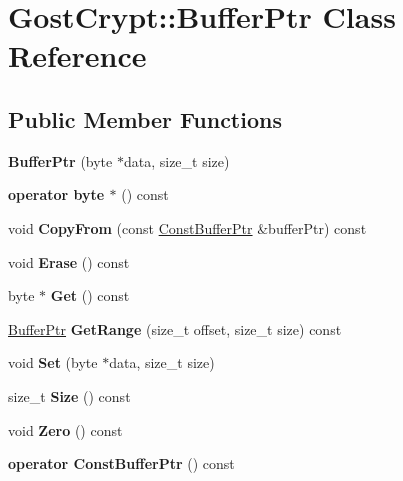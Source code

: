 \hypertarget{class_gost_crypt_1_1_buffer_ptr}{}\section{Gost\+Crypt\+:\+:Buffer\+Ptr Class Reference}
\label{class_gost_crypt_1_1_buffer_ptr}
\subsection*{Public Member Functions}
\begin{DoxyCompactItemize}
\item 
\mbox{\label{class_gost_crypt_1_1_buffer_ptr_aa4653bc7df919366a06b0e43c0cdd0f9}} 
{\bfseries Buffer\+Ptr} (byte $\ast$data, size\+\_\+t size)
\item 
\mbox{\label{class_gost_crypt_1_1_buffer_ptr_a1221ad784491b818cbdadbb60ae0c93a}} 
{\bfseries operator byte $\ast$} () const
\item 
\mbox{\label{class_gost_crypt_1_1_buffer_ptr_a6865e71f09b7a6bc81d5a61e227dc88e}} 
void {\bfseries Copy\+From} (const \hyperlink{class_gost_crypt_1_1_const_buffer_ptr}{Const\+Buffer\+Ptr} \&buffer\+Ptr) const
\item 
\mbox{\label{class_gost_crypt_1_1_buffer_ptr_a4c48cd5f9936d08c81d522cb057ba11c}} 
void {\bfseries Erase} () const
\item 
\mbox{\label{class_gost_crypt_1_1_buffer_ptr_a92c82dbba7c59d2564582a3918caacd5}} 
byte $\ast$ {\bfseries Get} () const
\item 
\mbox{\label{class_gost_crypt_1_1_buffer_ptr_a1ab1cb3943deba427d94c24a39d56786}} 
\hyperlink{class_gost_crypt_1_1_buffer_ptr}{Buffer\+Ptr} {\bfseries Get\+Range} (size\+\_\+t offset, size\+\_\+t size) const
\item 
\mbox{\label{class_gost_crypt_1_1_buffer_ptr_ae8963263d39a48506f88043f168c18c5}} 
void {\bfseries Set} (byte $\ast$data, size\+\_\+t size)
\item 
\mbox{\label{class_gost_crypt_1_1_buffer_ptr_a48acec7deeb8395eb5a925bc70204462}} 
size\+\_\+t {\bfseries Size} () const
\item 
\mbox{\label{class_gost_crypt_1_1_buffer_ptr_a462b1aa8a5b7417bb94a0aa6015cc922}} 
void {\bfseries Zero} () const
\item 
\mbox{\label{class_gost_crypt_1_1_buffer_ptr_a75b38d850a43b8d89b7f4f245ee2e19a}} 
{\bfseries operator Const\+Buffer\+Ptr} () const
\end{DoxyCompactItemize}
